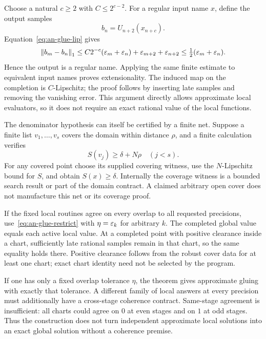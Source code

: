 Choose a natural $c\ge2$ with $C\le2^{c-2}$.  For a regular input
name $x$, define the output samples
\begin{equation}
 b_n=U_{n+2}(x_{n+c}).
 \label{eq:an-glue-name}
\end{equation}
Equation~\eqref{eq:an-glue-lip} gives
\[
 \left\lVert b_m-b_n\right\rVert_1
 \le C2^{-c}(\varepsilon_m+\varepsilon_n)
      +\varepsilon_{m+2}+\varepsilon_{n+2}
 \le\tfrac12(\varepsilon_m+\varepsilon_n).
\]
Hence the output is a regular name.  Applying the same finite estimate
to equivalent input names proves extensionality.  The induced map on
the completion is $C$-Lipschitz; the proof follows by inserting late
samples and removing the vanishing error.  This argument directly
allows approximate local evaluators, so it does not require an exact
rational value of the local functions.

The denominator hypothesis can itself be certified by a finite net.
Suppose a finite list $v_1,\ldots,v_s$ covers the domain within distance
$\rho$, and a finite calculation verifies
\[
 S(v_j)\ge\delta+N\rho\quad(j<s).
\]
For any covered point choose its supplied covering witness, use the
$N$-Lipschitz bound for $S$, and obtain $S(x)\ge\delta$.  Internally
the coverage witness is a bounded search result or part of the domain
contract.  A claimed arbitrary open cover does not manufacture this
net or its coverage proof.

If the fixed local routines agree on every overlap to all requested
precisions, use~\eqref{eq:an-glue-restrict} with
$\eta=\varepsilon_k$ for arbitrary $k$.  The completed global value equals
each active local value.  At a completed point with positive clearance
inside a chart, sufficiently late rational samples remain in that
chart, so the same equality holds there.  Positive clearance follows
from the robust cover data for at least one chart; exact chart identity
need not be selected by the program.

If one has only a fixed overlap tolerance $\eta$, the theorem gives
approximate gluing with exactly that tolerance.  A different family of
local answers at every precision must additionally have a cross-stage
coherence contract.  Same-stage agreement is insufficient: all charts
could agree on $0$ at even stages and on $1$ at odd stages.  Thus the
construction does not turn independent approximate local solutions
into an exact global solution without a coherence premise.

